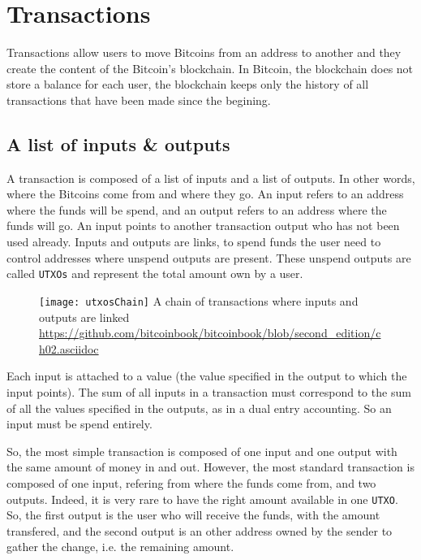 \section{Transactions}

Transactions allow users to move Bitcoins from an address to another and they create
the content of the Bitcoin's blockchain. In Bitcoin, the blockchain does not store a
balance for each user, the blockchain keeps only the history of all transactions that
have been made since the begining.

\subsection{A list of inputs \& outputs}

A transaction is composed of a list of inputs and a list of outputs. In other words,
where the Bitcoins come from and where they go. An input refers to an address where
the funds will be spend, and an output refers to an address where the funds will
go. An input points to another transaction output who has not been used already.
Inputs and outputs are links, to spend funds the user need to control addresses
where unspend outputs are present. These unspend outputs are called \texttt{UTXOs}
and represent the total amount own by a user.

\begin{figure}[H]
	\centering
	\texttt{[image: utxosChain]}
  {A chain of transactions where inputs and outputs are linked}
	{\url{https://github.com/bitcoinbook/bitcoinbook/blob/second_edition/ch02.asciidoc}}
	\label{fig:utxosChain}
\end{figure}

Each input is attached to a value (the value specified in the output to which the
input points). The sum of all inputs in a transaction must correspond to the sum
of all the values specified in the outputs, as in a dual entry accounting. So an
input must be spend entirely.

So, the most simple transaction is composed of one input and one output with the same
amount of money in and out.
However, the most standard transaction is composed of one input, refering from where the
funds come from, and two outputs. Indeed, it is very rare to have the right amount
available in one \texttt{UTXO}. So, the first output is the user who will receive
the funds, with the amount transfered, and the second output is an other address
owned by the sender to gather the change, i.e. the remaining amount.

